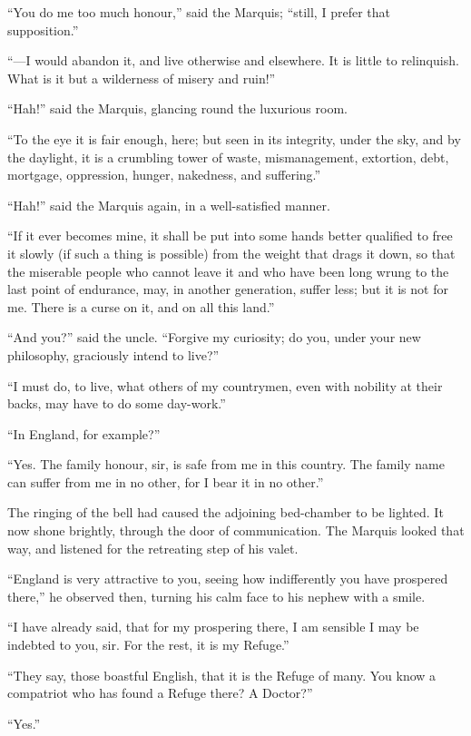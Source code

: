 ``You do me too much honour,'' said the Marquis; ``still, I prefer that
supposition.''

``---I would abandon it, and live otherwise and elsewhere.  It is
little to relinquish.  What is it but a wilderness of misery and ruin!''

``Hah!'' said the Marquis, glancing round the luxurious room.

``To the eye it is fair enough, here; but seen in its integrity, under
the sky, and by the daylight, it is a crumbling tower of waste,
mismanagement, extortion, debt, mortgage, oppression, hunger,
nakedness, and suffering.''

``Hah!'' said the Marquis again, in a well-satisfied manner.

``If it ever becomes mine, it shall be put into some hands better
qualified to free it slowly (if such a thing is possible) from the
weight that drags it down, so that the miserable people who cannot
leave it and who have been long wrung to the last point of endurance,
may, in another generation, suffer less; but it is not for me.
There is a curse on it, and on all this land.''

``And you?'' said the uncle.  ``Forgive my curiosity; do you, under your
new philosophy, graciously intend to live?''

``I must do, to live, what others of my countrymen, even with nobility
at their backs, may have to do some day-work.''

``In England, for example?''

``Yes.  The family honour, sir, is safe from me in this country.  The
family name can suffer from me in no other, for I bear it in no other.''

The ringing of the bell had caused the adjoining bed-chamber to be
lighted.  It now shone brightly, through the door of communication.
The Marquis looked that way, and listened for the retreating step of
his valet.

``England is very attractive to you, seeing how indifferently you have
prospered there,'' he observed then, turning his calm face to his
nephew with a smile.

``I have already said, that for my prospering there, I am sensible I
may be indebted to you, sir.  For the rest, it is my Refuge.''

``They say, those boastful English, that it is the Refuge of many.
You know a compatriot who has found a Refuge there?  A Doctor?''

``Yes.''

